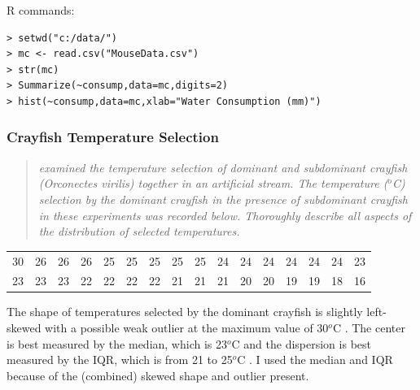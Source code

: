 \documentclass[10pt,openany]{book}\usepackage[]{graphicx}\usepackage[]{color}
\makeatletter
\newenvironment{kframe}{%
 \def\at@end@of@kframe{}%
 \ifinner\ifhmode%
  \def\at@end@of@kframe{\end{minipage}}%
  \begin{minipage}{\columnwidth}%
 \fi\fi%
 \def\FrameCommand##1{\hskip\@totalleftmargin \hskip-\fboxsep
 \colorbox{shadecolor}{##1}\hskip-\fboxsep
     \hskip-\linewidth \hskip-\@totalleftmargin \hskip\columnwidth}%
 \MakeFramed {\advance\hsize-\width
   \@totalleftmargin\z@ \linewidth\hsize
   \@setminipage}}%
 {\par\unskip\endMakeFramed%
 \at@end@of@kframe}
\newenvironment{knitrout}{}{} %
\makeatother
\begin{document}
\begin{minipage}{\textwidth}
R commands:
\begin{knitrout}
\color{fgcolor}\begin{kframe}
\begin{verbatim}
> setwd("c:/data/")
> mc <- read.csv("MouseData.csv")
> str(mc)
> Summarize(~consump,data=mc,digits=2)
> hist(~consump,data=mc,xlab="Water Consumption (mm)")
\end{verbatim}
\end{kframe}
\end{knitrout}
\end{minipage}

\subsubsection{Crayfish Temperature Selection}
\begin{quote}
\textit{\cite{Peck1985} examined the temperature selection of dominant and subdominant crayfish (\textit{Orconectes virilis}) together in an artificial stream.  The temperature ($^{o}$C) selection by the dominant crayfish in the presence of subdominant crayfish in these experiments was recorded below.  Thoroughly describe all aspects of the distribution of selected temperatures.}
\end{quote}

\begin{tabular}{rrrrrrrrrrrrrrrr}
  30 & 26 & 26 & 26 & 25 & 25 & 25 & 25 & 25 & 24 & 24 & 24 & 24 & 24 & 24 & 23 \\ 
  23 & 23 & 23 & 22 & 22 & 22 & 22 & 21 & 21 & 21 & 20 & 20 & 19 & 19 & 18 & 16 \\ 
  \end{tabular}


The shape of temperatures selected by the dominant crayfish is slightly left-skewed  with a possible weak outlier at the maximum value of 30$^{o}$C .  The center is best measured by the median, which is 23$^{o}$C  and the dispersion is best measured by the IQR, which is from 21 to 25$^{o}$C .  I used the median and IQR because of the (combined) skewed shape and outlier present.
\end{document}

